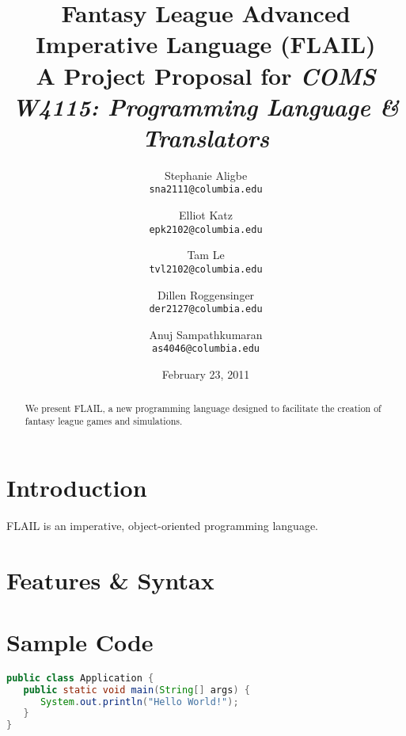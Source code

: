 \documentclass[12pt]{article}
\title{
{\bf Fantasy League Advanced\\
Imperative Language (FLAIL)}\\
{\small A Project Proposal for {\it COMS W4115: Programming Language \& Translators}}
}
\author{
	Stephanie Aligbe\\
	\texttt{\small{sna2111@columbia.edu}}
	\and
	Elliot Katz\\
	\texttt{\small{epk2102@columbia.edu}}
	\and
	Tam Le\\
	\texttt{\small{tvl2102@columbia.edu}}
	\and
	Dillen Roggensinger\\
	\texttt{\small{der2127@columbia.edu}}
	\and
	Anuj Sampathkumaran\\
	\texttt{\small{as4046@columbia.edu}}
}
\date{February 23, 2011}
\begin{document}
\maketitle

\begin{abstract}
We present FLAIL, a new programming language designed to facilitate the creation of fantasy league games and simulations. 
\begin{center}

\end{center}
\end{abstract}

\section{Introduction}
FLAIL is an imperative, object-oriented programming language.

\section{Features \& Syntax}

\section{Sample Code}
\begin{lstlisting}[language=Java]
public class Application {
   public static void main(String[] args) {
      System.out.println("Hello World!");
   }
}
\end{lstlisting}
\end{document}
